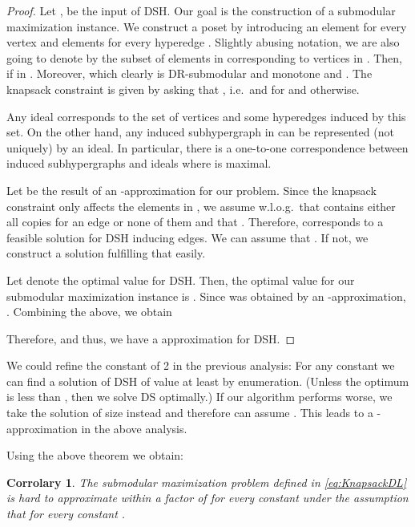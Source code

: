 \documentclass{article}
\theoremstyle{plain}
\newtheorem{corollary}[theorem]{Corrolary}
\theoremstyle{definition}
\begin{document}
\begin{proof}
Let ,  be the input of DSH.  
Our goal is the construction of a submodular maximization instance. 
We construct a poset  by introducing an element  for every vertex  and 
 elements  for every hyperedge . 
Slightly abusing notation, we are also going to denote by  the subset of elements in  corresponding to vertices in .  
Then,  if  in . 
Moreover,  which clearly is DR-submodular and monotone and . 
The knapsack constraint is given by asking that , i.e.\  and  for  and  otherwise. 


Any ideal  corresponds to the set of vertices  and some hyperedges induced by this set.
On the other hand, any induced subhypergraph in  can be represented (not uniquely) by an ideal. 
In particular, there is a one-to-one correspondence between induced subhypergraphs and ideals  where  is maximal. 

Let  be the result of an -approximation for our problem. Since the knapsack constraint only 
affects the elements in , we assume w.l.o.g.\ that  contains either all copies  for an edge  or none of them and that . 
Therefore,  corresponds to a feasible solution for DSH inducing  edges.
We can assume that . If not, we construct a solution fulfilling that easily.  

Let  denote the optimal value for DSH. Then, the optimal value for our submodular maximization instance is 
. 
Since  was obtained by an -approximation,  
. 
Combining the above, we obtain 

Therefore,
 and thus, we have a  approximation for DSH.  
\end{proof}

We could refine the constant of 2 in the previous analysis: 
For any constant  we can find a solution of DSH 
of value at least  by enumeration. (Unless the optimum is less than , then we solve DS optimally.)
If our algorithm performs worse, we take the solution of size  instead and therefore can assume 
. This leads to a -approximation in the above analysis.  


Using the above theorem we obtain: 

\begin{corollary}
The submodular maximization problem defined in \eqref{eq:KnapsackDL} is hard to approximate within a factor  
of  for every constant  under the assumption that 
 for every constant . 
\end{corollary}
\end{document}
